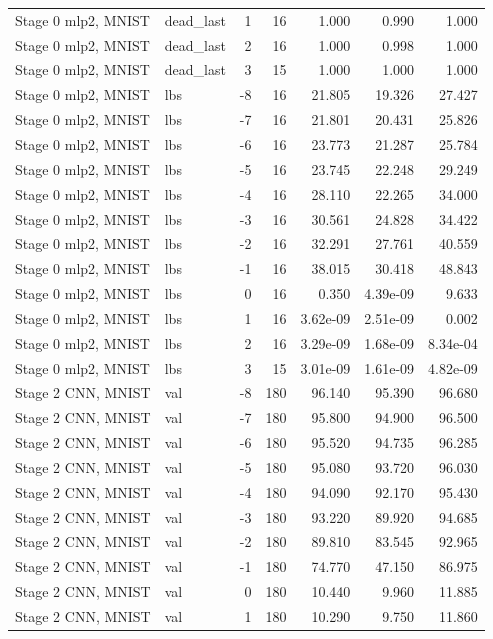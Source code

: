 \begin{table}[htbp]
{\begin{tabular}{@{}llrrrrr@{}}
Stage 0 mlp2, MNIST & dead\_last & 1 & 16 & 1.000 & 0.990 & 1.000 \\
Stage 0 mlp2, MNIST & dead\_last & 2 & 16 & 1.000 & 0.998 & 1.000 \\
Stage 0 mlp2, MNIST & dead\_last & 3 & 15 & 1.000 & 1.000 & 1.000 \\
Stage 0 mlp2, MNIST & lbs & -8 & 16 & 21.805 & 19.326 & 27.427 \\
Stage 0 mlp2, MNIST & lbs & -7 & 16 & 21.801 & 20.431 & 25.826 \\
Stage 0 mlp2, MNIST & lbs & -6 & 16 & 23.773 & 21.287 & 25.784 \\
Stage 0 mlp2, MNIST & lbs & -5 & 16 & 23.745 & 22.248 & 29.249 \\
Stage 0 mlp2, MNIST & lbs & -4 & 16 & 28.110 & 22.265 & 34.000 \\
Stage 0 mlp2, MNIST & lbs & -3 & 16 & 30.561 & 24.828 & 34.422 \\
Stage 0 mlp2, MNIST & lbs & -2 & 16 & 32.291 & 27.761 & 40.559 \\
Stage 0 mlp2, MNIST & lbs & -1 & 16 & 38.015 & 30.418 & 48.843 \\
Stage 0 mlp2, MNIST & lbs & 0 & 16 & 0.350 & 4.39e-09 & 9.633 \\
Stage 0 mlp2, MNIST & lbs & 1 & 16 & 3.62e-09 & 2.51e-09 & 0.002 \\
Stage 0 mlp2, MNIST & lbs & 2 & 16 & 3.29e-09 & 1.68e-09 & 8.34e-04 \\
Stage 0 mlp2, MNIST & lbs & 3 & 15 & 3.01e-09 & 1.61e-09 & 4.82e-09 \\
Stage 2 CNN, MNIST & val & -8 & 180 & 96.140 & 95.390 & 96.680 \\
Stage 2 CNN, MNIST & val & -7 & 180 & 95.800 & 94.900 & 96.500 \\
Stage 2 CNN, MNIST & val & -6 & 180 & 95.520 & 94.735 & 96.285 \\
Stage 2 CNN, MNIST & val & -5 & 180 & 95.080 & 93.720 & 96.030 \\
Stage 2 CNN, MNIST & val & -4 & 180 & 94.090 & 92.170 & 95.430 \\
Stage 2 CNN, MNIST & val & -3 & 180 & 93.220 & 89.920 & 94.685 \\
Stage 2 CNN, MNIST & val & -2 & 180 & 89.810 & 83.545 & 92.965 \\
Stage 2 CNN, MNIST & val & -1 & 180 & 74.770 & 47.150 & 86.975 \\
Stage 2 CNN, MNIST & val & 0 & 180 & 10.440 & 9.960 & 11.885 \\
Stage 2 CNN, MNIST & val & 1 & 180 & 10.290 & 9.750 & 11.860 \\

\end{tabular}}
\end{table}
